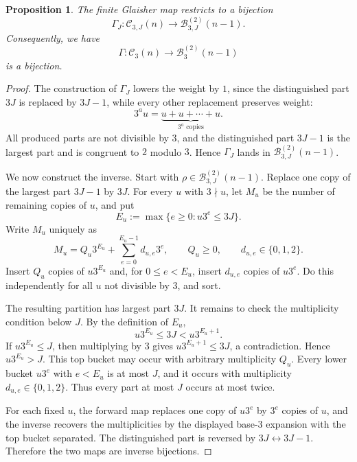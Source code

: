 \documentclass[11pt]{amsart}
\newtheorem{proposition}[theorem]{Proposition}
\theoremstyle{definition}
\theoremstyle{remark}
\newcommand{\C}{\mathcal C}
\newcommand{\B}{\mathcal B}
\begin{document}
\begin{proposition}\label{prop:gamma}
The finite Glaisher map restricts to a bijection
\[
        \Gamma_J:\C_{3,J}(n)\longrightarrow\B_{3,J}^{(2)}(n-1).
\]
Consequently, we have
\[
        \Gamma:\C_3(n)\longrightarrow\B_3^{(2)}(n-1)
\]
is a bijection.
\end{proposition}

\begin{proof}
The construction of $\Gamma_J$ lowers the weight by $1$, since the distinguished part $3J$ is replaced by $3J-1$, while every other replacement preserves weight:
\[
        3^a u=\underbrace{u+u+\cdots+u}_{3^a\text{ copies}}.
\]
All produced parts are not divisible by $3$, and the distinguished part $3J-1$ is the largest part and is congruent to $2$ modulo $3$.  Hence $\Gamma_J$ lands in $\B_{3,J}^{(2)}(n-1)$.

We now construct the inverse.  Start with $\rho\in\B_{3,J}^{(2)}(n-1)$.  Replace one copy of the largest part $3J-1$ by $3J$.  For every $u$ with $3\nmid u$, let $M_u$ be the number of remaining copies of $u$, and put
\[
        E_u:=\max\{e\ge0:u3^e\le3J\}.
\]
Write $M_u$ uniquely as
\[
        M_u=Q_u3^{E_u}+\sum_{e=0}^{E_u-1}d_{u,e}3^e,
        \qquad Q_u\ge0,
        \qquad d_{u,e}\in\{0,1,2\}.
\]
Insert $Q_u$ copies of $u3^{E_u}$ and, for $0\le e<E_u$, insert $d_{u,e}$ copies of $u3^e$.  Do this independently for all $u$ not divisible by $3$, and sort.

The resulting partition has largest part $3J$.  It remains to check the multiplicity condition below $J$.  By the definition of $E_u$,
\[
        u3^{E_u}\le3J<u3^{E_u+1}.
\]
If $u3^{E_u}\le J$, then multiplying by $3$ gives $u3^{E_u+1}\le3J$, a contradiction.  Hence $u3^{E_u}>J$.  This top bucket may occur with arbitrary multiplicity $Q_u$.  Every lower bucket $u3^e$ with $e<E_u$ is at most $J$, and it occurs with multiplicity $d_{u,e}\in\{0,1,2\}$.  Thus every part at most $J$ occurs at most twice.

For each fixed $u$, the forward map replaces one copy of $u3^e$ by $3^e$ copies of $u$, and the inverse recovers the multiplicities by the displayed base-$3$ expansion with the top bucket separated.  The distinguished part is reversed by $3J\leftrightarrow 3J-1$.  Therefore the two maps are inverse bijections.
\end{proof}
\end{document}

